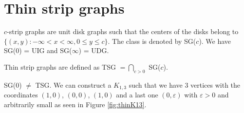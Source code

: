\chapter{Thin strip graphs}
\label{chap:thinDef}



$c$-strip graphs are unit disk graphs such that the centers of the disks belong to
$\{(x,y) : -\infty < x < \infty, 0 \leq y \leq c\}$. The class is denoted by SG($c$). We
have SG(0) = UIG and SG($\infty$) = UDG. \cite{hayashiThinStripGraphs2017}

\begin{defn}
  Thin strip graphs are defined as TSG $= \bigcap_{c > 0}$ SG($c$).
\end{defn}

\begin{remark}
  SG($0$) $\neq$ TSG. We can construct a $K_{1,3}$ such that we have 3 vertices with the coordinates
  $(1,0)$, $(0,0)$, $(1,0)$ and a last one $(0,\varepsilon)$ with $\varepsilon > 0$ and arbitrarily small
  as seen in Figure \ref{fig:thinK13}.
\end{remark}

